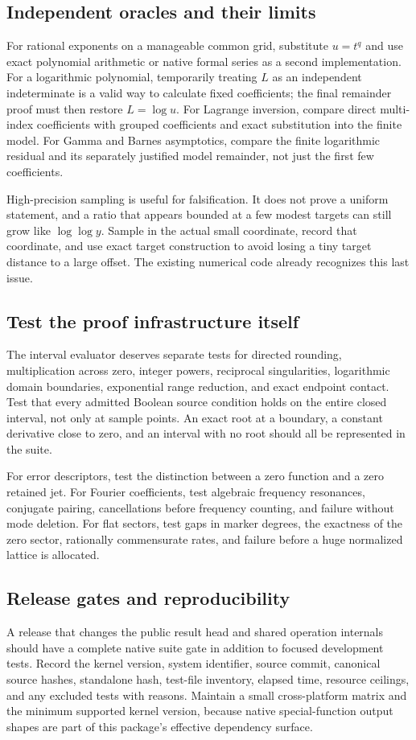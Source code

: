 \documentclass[11pt,letterpaper]{article}
\begin{document}
\subsection{Independent oracles and their limits}
For rational exponents on a manageable common grid, substitute $u=t^q$ and use exact polynomial arithmetic or native formal series as a second implementation. For a logarithmic polynomial, temporarily treating $L$ as an independent indeterminate is a valid way to calculate fixed coefficients; the final remainder proof must then restore $L=\log u$. For Lagrange inversion, compare direct multi-index coefficients with grouped coefficients and exact substitution into the finite model. For Gamma and Barnes asymptotics, compare the finite logarithmic residual and its separately justified model remainder, not just the first few coefficients.

High-precision sampling is useful for falsification. It does not prove a uniform statement, and a ratio that appears bounded at a few modest targets can still grow like $\log\log y$. Sample in the actual small coordinate, record that coordinate, and use exact target construction to avoid losing a tiny target distance to a large offset. The existing numerical code already recognizes this last issue.\cite{repo-numeric}

\subsection{Test the proof infrastructure itself}
The interval evaluator deserves separate tests for directed rounding, multiplication across zero, integer powers, reciprocal singularities, logarithmic domain boundaries, exponential range reduction, and exact endpoint contact. Test that every admitted Boolean source condition holds on the entire closed interval, not only at sample points. An exact root at a boundary, a constant derivative close to zero, and an interval with no root should all be represented in the suite.\cite{repo-cert}

For error descriptors, test the distinction between a zero function and a zero retained jet. For Fourier coefficients, test algebraic frequency resonances, conjugate pairing, cancellations before frequency counting, and failure without mode deletion. For flat sectors, test gaps in marker degrees, the exactness of the zero sector, rationally commensurate rates, and failure before a huge normalized lattice is allocated.\cite{repo-fourier,repo-flat}

\subsection{Release gates and reproducibility}
A release that changes the public result head and shared operation internals should have a complete native suite gate in addition to focused development tests. Record the kernel version, system identifier, source commit, canonical source hashes, standalone hash, test-file inventory, elapsed time, resource ceilings, and any excluded tests with reasons. Maintain a small cross-platform matrix and the minimum supported kernel version, because native special-function output shapes are part of this package's effective dependency surface.
\end{document}
